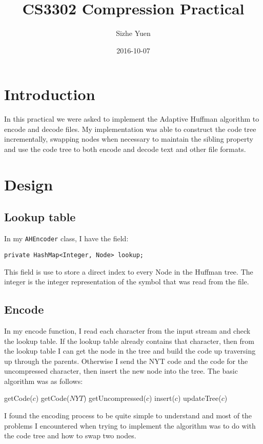 \documentclass{article}
\title{CS3302 Compression Practical}
\date{2016-10-07}
\author{Sizhe Yuen}
\newcommand{\n}[0]{\newline}
\begin{document}
\maketitle

\newpage
{}

\section{Introduction}
In this practical we were asked to implement the Adaptive Huffman algorithm to encode and decode files. My implementation was able to construct the code tree incrementally, swapping nodes when necessary to maintain the sibling property and use the code tree to both encode and decode text and other file formats. 

\section{Design}
\subsection{Lookup table}
In my \texttt{AHEncoder} class, I have the field: 
\begin{lstlisting}
private HashMap<Integer, Node> lookup;
\end{lstlisting}
This field is use to store a direct index to every Node in the Huffman tree. The integer is the integer representation of the symbol that was read from the file. 
\subsection{Encode}
In my encode function, I read each character from the input stream and check the lookup table. If the lookup table already contains that character, then from the lookup table I can get the node in the tree and build the code up traversing up through the parents. Otherwise I send the NYT code and the code for the uncompressed character, then insert the new node into the tree. The basic algorithm was as follows:
\begin{algorithm}
\begin{algorithmic}
    	\State getCode($c$)
    \Else
    	\State getCode($NYT$)
    	\State getUncompressed($c$)
    	\State insert($c$)
    \EndIf
    \State updateTree($c$)
\EndWhile
\end{algorithmic}
\end{algorithm}
\n I found the encoding process to be quite simple to understand and most of the problems I encountered when trying to implement the algorithm was to do with the code tree and how to swap two nodes. 
\end{document}
